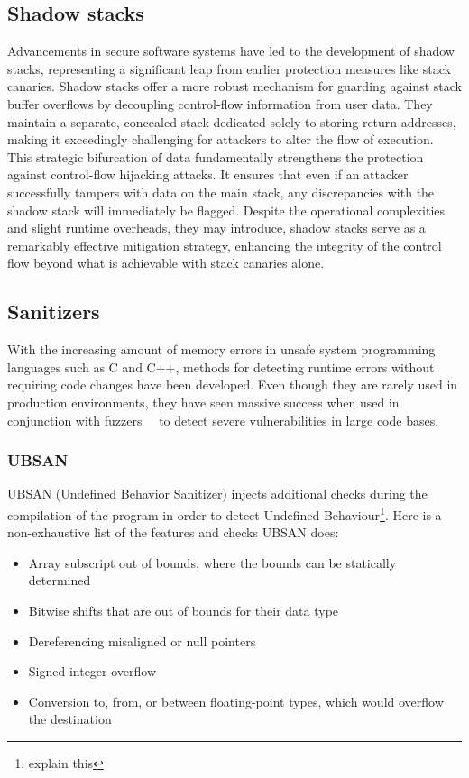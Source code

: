 \documentclass{article}
\begin{document}
\subsection{Shadow stacks}
Advancements in secure software systems have led to the development of shadow stacks, representing a significant leap from earlier protection measures like stack canaries. Shadow stacks offer a more robust mechanism for guarding against stack buffer overflows by decoupling control-flow information from user data. They maintain a separate, concealed stack dedicated solely to storing return addresses, making it exceedingly challenging for attackers to alter the flow of execution. This strategic bifurcation of data fundamentally strengthens the protection against control-flow hijacking attacks. It ensures that even if an attacker successfully tampers with data on the main stack, any discrepancies with the shadow stack will immediately be flagged. Despite the operational complexities and slight runtime overheads, they may introduce, shadow stacks serve as a remarkably effective mitigation strategy, enhancing the integrity of the control flow beyond what is achievable with stack canaries alone.

\subsection{Sanitizers}
With the increasing amount of memory errors in unsafe system programming languages such as C and C++, methods for detecting runtime errors without requiring code changes have been developed. Even though they are rarely used in production environments, they have seen massive success when used in conjunction with fuzzers~\cite{fuzz1}~\cite{fuzz2} to detect severe vulnerabilities in large code bases.

\subsubsection{UBSAN}
UBSAN (Undefined Behavior Sanitizer) injects additional checks during the compilation of the program in order to detect Undefined Behaviour\footnote{explain this}. Here is a non-exhaustive list of the features and checks UBSAN does:

\begin{itemize}
  \item Array subscript out of bounds, where the bounds can be statically determined
  \item Bitwise shifts that are out of bounds for their data type
  \item Dereferencing misaligned or null pointers
  \item Signed integer overflow
  \item Conversion to, from, or between floating-point types, which would overflow the destination
\end{itemize}
\end{document}
